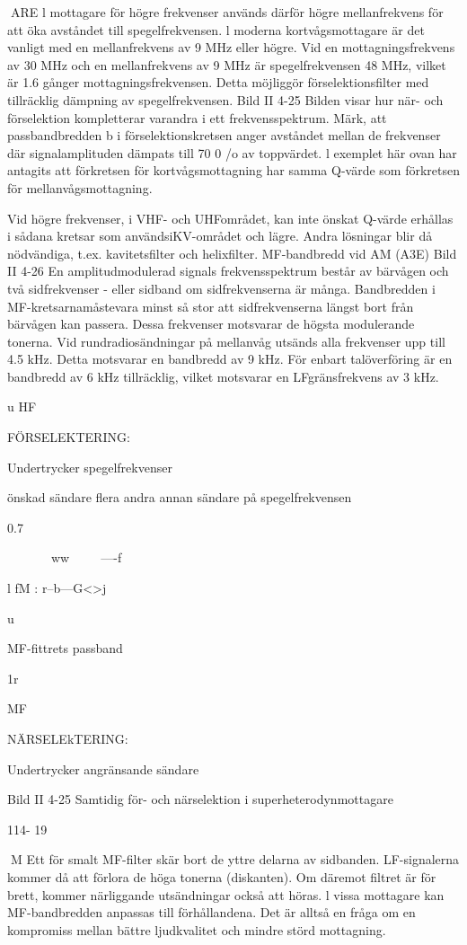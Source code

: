 ARE
l mottagare för högre frekvenser används
därför högre mellanfrekvens för att öka avståndet till spegelfrekvensen. l moderna
kortvågsmottagare är det vanligt med en
mellanfrekvens av 9 MHz eller högre. Vid en
mottagningsfrekvens av 30 MHz och en
mellanfrekvens av 9 MHz är spegelfrekvensen 48 MHz, vilket är 1.6 gånger mottagningsfrekvensen. Detta möjliggör förselektionsfilter med tillräcklig dämpning av spegelfrekvensen.
Bild II 4-25
Bilden visar hur när- och förselektion kompletterar varandra i ett frekvensspektrum.
Märk, att passbandbredden b i förselektionskretsen anger avståndet mellan de frekvenser där signalamplituden dämpats till 70
0
/o av toppvärdet. l exemplet här ovan har
antagits att förkretsen för kortvågsmottagning har samma Q-värde som förkretsen för
mellanvågsmottagning.

Vid högre frekvenser, i VHF- och UHFområdet, kan inte önskat Q-värde erhållas i
sådana kretsar som användsiKV-området
och lägre. Andra lösningar blir då nödvändiga, t.ex. kavitetsfilter och helixfilter.
MF-bandbredd vid AM (A3E)
Bild II 4-26
En amplitudmodulerad signals frekvensspektrum består av bärvågen och två sidfrekvenser - eller sidband om sidfrekvenserna är många.
Bandbredden i MF-kretsarnamåstevara
minst så stor att sidfrekvenserna längst bort
från bärvågen kan passera. Dessa frekvenser motsvarar de högsta modulerande tonerna. Vid rundradiosändningar på mellanvåg utsänds alla frekvenser upp till 4.5 kHz.
Detta motsvarar en bandbredd av 9 kHz.
För enbart talöverföring är en bandbredd av
6 kHz tillräcklig, vilket motsvarar en LFgränsfrekvens av 3 kHz.

u
HF

FÖRSELEKTERING:

Undertrycker spegelfrekvenser

önskad sändare
flera andra
annan sändare på
spegelfrekvensen

0.7

~~~~~~~ww~~~~~----f

l fM :
r--b---G<>j

u

MF-fittrets passband

1r

MF

NÄRSELEkTERING:

Undertrycker angränsande sändare

Bild II 4-25 Samtidig för- och närselektion i superheterodynmottagare

114- 19

M
Ett för smalt MF-filter skär bort de yttre
delarna av sidbanden. LF-signalerna kommer då att förlora de höga tonerna (diskanten). Om däremot filtret är för brett, kommer
närliggande utsändningar också att höras.
l vissa mottagare kan MF-bandbredden
anpassas till förhållandena. Det är alltså en
fråga om en kompromiss mellan bättre ljudkvalitet och mindre störd mottagning.

